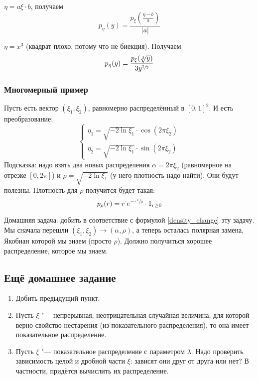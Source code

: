 \begin{exmp}
	$\eta = a\xi \cdot b$, получаем
	\[ p_{\eta}(y) = \frac{p_{\xi}\left(\frac{\eta-b}{a}\right)}{|a|} \]
\end{exmp}
\begin{exmp}
	$\eta = x^3$ (квадрат плохо, потому что не биекция).
	Получаем
	\[ p_{\eta}(y) = \frac{p_{\xi}(\sqrt[3]{y})}{3y^{\sfrac23}} \]
\end{exmp}

\subsubsection{Многомерный пример}
Пусть есть вектор $(\xi_1, \xi_2)$, равномерно распределённый в $[0,1]^2$.
И есть преобразование:
\[
	\begin{cases}
		\eta_1 = \sqrt{-2\ln \xi_1} \cdot \cos (2 \pi \xi_2) \\
		\eta_2 = \sqrt{-2\ln \xi_1} \cdot \sin (2 \pi \xi_2)
	\end{cases}
\]
Подсказка: надо взять два новых распределения $\alpha=2\pi \xi_2$ (равномерное на отрезке $[0, 2\pi]$)
и $\rho = \sqrt{-2\ln \xi_1}$ (у него плотность надо найти).
Они будут полезны.
Плотность для $\rho$ получится будет такая:
\[ p_{\rho}(r) = r^\cdot e^{-\sfrac{r^2}{2}} \cdot \mathrm{1}_{r \ge 0} \]

Домашняя задача: добить в соответствие с формулой \ref{density_change} эту задачу.
Мы сначала перешли $(\xi_1, \xi_2) \to (\alpha, \rho)$, а теперь осталась полярная замена,
Якобиан которой мы знаем (просто $\rho$).
Должно получиться хорошее распределение, которое мы знаем.

\subsection{Ещё домашнее задание}
\begin{enumerate}
	\item Добить предыдущий пункт.
	\item Пусть $\xi$ "--- непрерывная, неотрицательная случайная величина, для которой верно свойство нестарения (из показательного распределения), то она имеет показательное распределение.
	\item Пусть $\xi$ "--- показательное распределение с параметром $\lambda$.
		Надо проверить зависимость целой и дробной части $\xi$: зависят они друг от друга или нет?
		В частности, придётся вычислить их распределение.
\end{enumerate}

